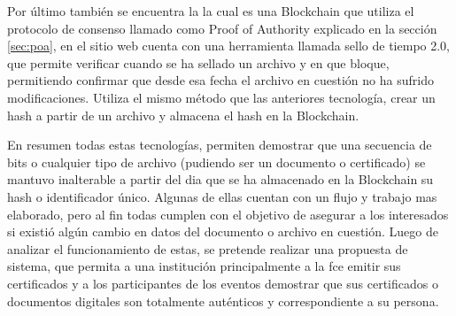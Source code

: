 Por último también se encuentra la  la cual es una  Blockchain que utiliza el protocolo de consenso llamado como Proof of Authority explicado en la sección 
\ref{sec:poa}, en el sitio web cuenta con una herramienta llamada sello de tiempo 2.0, que permite verificar cuando se ha sellado un archivo y en que bloque,
permitiendo confirmar que desde esa fecha el archivo en cuestión no ha sufrido modificaciones. Utiliza el mismo método que las anteriores tecnología, 
crear un hash a partir de un archivo y almacena el hash en la Blockchain.

En resumen todas estas tecnologías, permiten demostrar que una secuencia de bits o cualquier tipo de archivo (pudiendo ser
 un documento o certificado) se mantuvo inalterable a partir del dia que se ha almacenado en la  Blockchain su hash o identificador único. Algunas de ellas 
cuentan con un flujo y trabajo mas elaborado, pero al fin todas cumplen con el objetivo de asegurar a los interesados si existió algún cambio en datos
del documento o archivo en cuestión. 
Luego de analizar el funcionamiento de estas, se pretende realizar una propuesta de sistema, que permita a una institución principalmente 
a la \gls{fce} emitir sus certificados y a los participantes de los eventos  demostrar que sus 
certificados o documentos digitales son totalmente auténticos y correspondiente  a su persona. 

